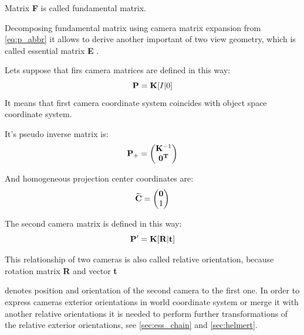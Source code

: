 \documentclass[a4paper,12pt]{article}
\newcommand{\ematr}[1]{
{\bf #1}
}
\newcommand{\evect}[1]{
{\bf #1}
}
\newcommand{\ehvect}[1]{
{\bf \widetilde{#1}}
}
\begin{document}
Matrix \ematr{F} is called fundamental matrix. 

Decomposing fundamental matrix using camera matrix expansion from \eqref{eq:p_abbr}
it allows to derive another important of two view geometry, which is called essential matrix \ematr{E}.

Lets suppose that firs camera matrices are defined in this way:
\begin{equation}
\label{eq:rel_or_cam1}
\ematr{P}  = \ematr{K} \ematr{[}I|0\ematr{]}
\end{equation}
It means that first camera coordinate system coincides with object space coordinate 
system.

It's pseudo inverse matrix is:
\begin{equation}
\ematr{P}_{+} =
\begin{pmatrix}
   \ematr{K}^{-1} \\
   \evect{0^{T}} \\
\end{pmatrix}
\end{equation}

And homogeneous projection center coordinates are:
\begin{equation}
\ehvect{C} =
\begin{pmatrix}
   \evect{0} \\
    1 \\
\end{pmatrix}
\end{equation}


The second camera matrix is defined in this way:
\begin{equation}
\label{eq:rel_or_cam2}
\ematr{P}'  = \ematr{K} \ematr{[}\ematr{R}|\evect{t}\ematr{]}
\end{equation}

This relationship of two cameras is also called relative orientation, because rotation matrix \ematr{R} and vector \evect{t}
denotes position and orientation of the second camera to the first one. In order to express cameras exterior orientations in world coordinate 
system or merge it with another relative orientations it is needed to perform further transformations of the relative 
exterior orientations, see \ref{sec:ess_chain} and \ref{sec:helmert}.
\end{document}
